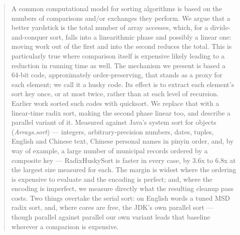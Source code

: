 \documentclass[twoside,leqno,twocolumn]{article}
\newif\ifdraftstamp
\newcommand{\revisionstamp}{%
  \hsstamphr=\time \divide\hsstamphr by 60
  \hsstamptmp=\hsstamphr \multiply\hsstamptmp by 60
  \hsstampmin=\time \advance\hsstampmin by -\hsstamptmp
  \the\year-\ifnum\month<10 0\fi\the\month-\ifnum\day<10 0\fi\the\day\space
  \ifnum\hsstamphr<10 0\fi\the\hsstamphr:\ifnum\hsstampmin<10 0\fi\the\hsstampmin}
\begin{document}
\begin{abstract}
    A common computational model for sorting algorithms is based on the numbers of comparisons and/or exchanges they perform.
    We argue that a better yardstick is the total number of array accesses,
    which, for a divide-and-conquer sort, falls into a linearithmic phase and possibly a linear one:
    moving work out of the first and into the second reduces the total.
    This is particularly true where comparison itself is expensive likely leading to a reduction in running time as well.
    The mechanism we present is based a 64-bit code, approximately order-preserving,
    that stands as a proxy for each element; we call it a husky code.
    Its effect is to extract each element's sort key once, or at most twice, rather than at each level of recursion.
    Earlier work sorted such codes with quicksort.
    We replace that with a linear-time radix sort, making the second phase linear too,
    and describe a parallel variant of it.
    Measured against Java's system sort for objects (\textit{Arrays.sort}) --- integers,
    arbitrary-precision numbers,
    dates, tuples, English and Chinese text, Chinese personal names in pinyin order,
    and, by way of example, a large number of municipal records ordered by a composite key ---
    RadixHuskySort is faster in every case, by 3.6x to 6.8x at the largest size measured for each.
    The margin is widest where the ordering is expensive to evaluate and the encoding is perfect;
    and, where the encoding is imperfect, we measure directly what the resulting cleanup pass costs.
    Two things overtake the serial sort: on English words a tuned MSD radix sort, and, where cores
    are free, the JDK's own parallel sort --- though parallel against parallel our own variant
    leads that baseline wherever a comparison is expensive.
\end{abstract}



\fancyfoot[C]{\thepage}
\ifdraftstamp
  \fancyfoot[R]{\footnotesize\itshape draft \revisionstamp}
\fi
\end{document}

